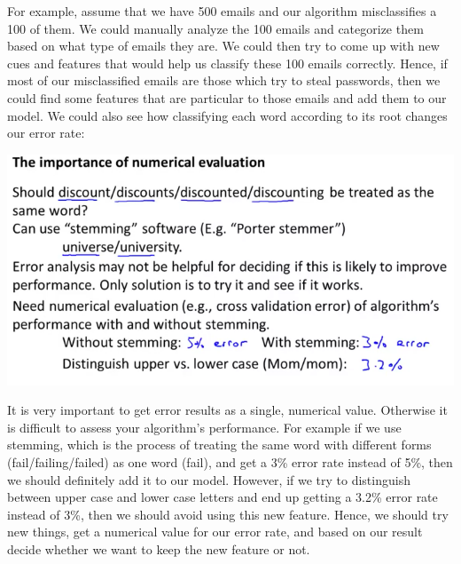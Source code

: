 \documentclass[10pt,a4paper,UTF8]{article}
\begin{document}
For example, assume that we have 500 emails and our algorithm misclassifies a 100 of them. We could manually analyze the 100 emails and categorize them based on what type of emails they are. We could then try to come up with new cues and features that would help us classify these 100 emails correctly. Hence, if most of our misclassified emails are those which try to steal passwords, then we could find some features that are particular to those emails and add them to our model. We could also see how classifying each word according to its root changes our error rate:

\begin{center}
\includegraphics[width=.9\linewidth]{../../img/computer_ng/20171015errorAnalysis.png}
\end{center}

It is very important to get error results as a single, numerical value. Otherwise it is difficult to assess your algorithm's performance. For example if we use stemming, which is the process of treating the same word with different forms (fail/failing/failed) as one word (fail), and get a 3\% error rate instead of 5\%, then we should definitely add it to our model. However, if we try to distinguish between upper case and lower case letters and end up getting a 3.2\% error rate instead of 3\%, then we should avoid using this new feature. Hence, we should try new things, get a numerical value for our error rate, and based on our result decide whether we want to keep the new feature or not.
\end{document}
